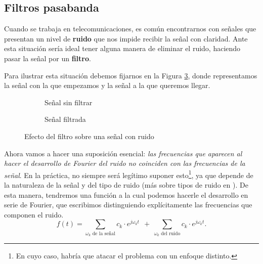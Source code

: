 \subsection{Filtros pasabanda}
Cuando se trabaja en telecomunicaciones, es común encontrarnos con señales que presentan un nivel de \textbf{ruido} que nos impide recibir la señal con claridad. Ante esta situación sería ideal tener alguna manera de eliminar el ruido, haciendo pasar la señal por un \textbf{filtro}.

Para ilustrar esta situación debemos fijarnos en la Figura \ref{fig:EfectoFiltro}, donde representamos la señal con la que empezamos y la señal a la que queremos llegar.


\begin{figure}[h]
\begin{figurebox}
    \vspace{10pt}
    \centering
      \begin{subfigure}{.45\textwidth}
          \centering
          \scalebox{0.30}{ }
          \caption{Señal sin filtrar}
          \label{fig:0a} 
      \end{subfigure}%
      \begin{subfigure}{.45\textwidth}
          \centering
          \scalebox{0.30}{}
          \caption{Señal filtrada}
          \label{fig:0b}
      \end{subfigure}
      \caption{Efecto del filtro sobre una señal con ruido}
      \label{fig:EfectoFiltro}
    
\end{figurebox}
\end{figure}

Ahora vamos a hacer una suposición esencial: \textit{las frecuencias que aparecen al hacer el desarrollo de Fourier del ruido no coinciden con las frecuencias de la señal}. En la práctica, no siempre será legítimo suponer esto\footnote{ En cuyo caso, habría que atacar el problema con un enfoque distinto.}, ya que depende de la naturaleza de la señal y del tipo de ruido (más sobre tipos de ruido en \cite{ColorNoise}). De esta manera, tendremos una función a la cual podemos hacerle el desarrollo en serie de Fourier, que escribimos distinguiendo explícitamente las frecuencias que componen el ruido.
\begin{equation}
  \label{eq:FourierSignalRuido1}
  f(t) = \sum_{\omega_k\text{ de la señal}}\!\!\!\!\!\!\!c_k \cdot e^{j\omega_k t}\ \ +\  \sum_{\omega_k\text{ del ruido}}\!\!\!\!\!c_k \cdot e^{j\omega_k t}.
\end{equation}

